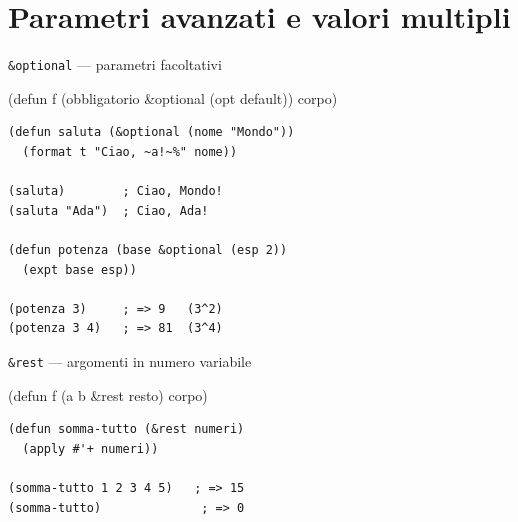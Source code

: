 \section{Parametri avanzati e valori multipli}


\begin{concetto}{\texttt{\&optional} --- parametri facoltativi}

\begin{sintassi}
(defun f (obbligatorio \&optional (opt default)) corpo)
\end{sintassi}

\end{concetto}

\begin{esempio}
\begin{lstlisting}
(defun saluta (&optional (nome "Mondo"))
  (format t "Ciao, ~a!~%" nome))

(saluta)        ; Ciao, Mondo!
(saluta "Ada")  ; Ciao, Ada!

(defun potenza (base &optional (esp 2))
  (expt base esp))

(potenza 3)     ; => 9   (3^2)
(potenza 3 4)   ; => 81  (3^4)
\end{lstlisting}
\end{esempio}

\seprule


\begin{concetto}{\texttt{\&rest} --- argomenti in numero variabile}

\begin{sintassi}
(defun f (a b \&rest resto) corpo)
\end{sintassi}

\end{concetto}

\begin{esempio}
\begin{lstlisting}
(defun somma-tutto (&rest numeri)
  (apply #'+ numeri))

(somma-tutto 1 2 3 4 5)   ; => 15
(somma-tutto)              ; => 0
\end{lstlisting}
\end{esempio}

